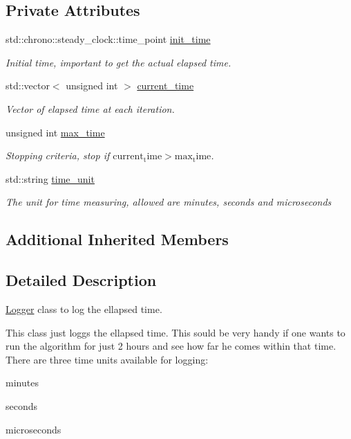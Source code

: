 \subsection*{Private Attributes}
\begin{DoxyCompactItemize}
\item 
std\+::chrono\+::steady\+\_\+clock\+::time\+\_\+point \hyperlink{classlogger_1_1_logger_time_ace1b159544a0120633c506d36e0d22e0}{init\+\_\+time}
\begin{DoxyCompactList}\small\item\em Initial time, important to get the actual elapsed time. \end{DoxyCompactList}\item 
std\+::vector$<$ unsigned int $>$ \hyperlink{classlogger_1_1_logger_time_a9c26fbdef41cacef1e7f630839f3a4d2}{current\+\_\+time}
\begin{DoxyCompactList}\small\item\em Vector of elapsed time at each iteration. \end{DoxyCompactList}\item 
unsigned int \hyperlink{classlogger_1_1_logger_time_a1aec07a58b6d91c7931e627fc25018ff}{max\+\_\+time}
\begin{DoxyCompactList}\small\item\em Stopping criteria, stop if $\mathrm{current_time} > \mathrm{max_time}$. \end{DoxyCompactList}\item 
std\+::string \hyperlink{classlogger_1_1_logger_time_a98bc56e547f8f32a3db03907347335da}{time\+\_\+unit}
\begin{DoxyCompactList}\small\item\em The unit for time measuring, allowed are {\ttfamily minutes}, {\ttfamily seconds} and {\ttfamily microseconds} \end{DoxyCompactList}\end{DoxyCompactItemize}
\subsection*{Additional Inherited Members}


\subsection{Detailed Description}
\hyperlink{classlogger_1_1_logger}{Logger} class to log the ellapsed time. 

This class just loggs the ellapsed time. This sould be very handy if one wants to run the algorithm for just 2 hours and see how far he comes within that time. There are three time units available for logging\+:
\begin{DoxyItemize}
\item minutes
\item seconds
\item microseconds 
\end{DoxyItemize}

